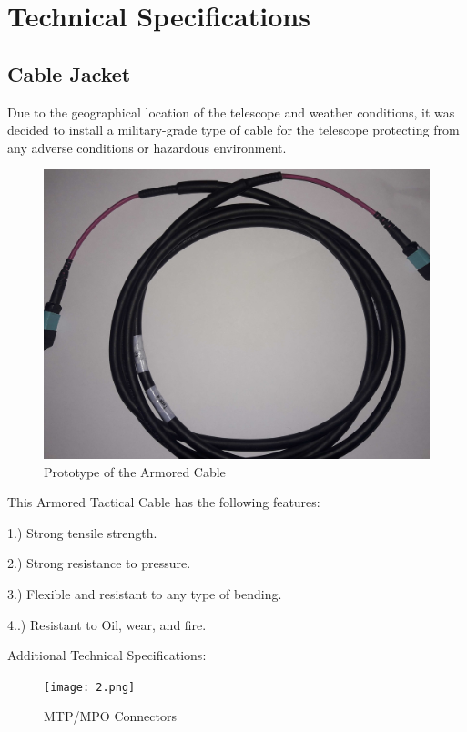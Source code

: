 \section{Technical Specifications}

\subsection{Cable Jacket}

Due to the geographical location of the telescope and weather conditions, it was decided to install a military-grade type of cable for the telescope protecting from any adverse conditions or hazardous environment. 

\begin{figure}
  \includegraphics[width=\textwidth]{images/mtp_militar_cable.jpg}
  \caption{Prototype of the Armored Cable}
  \label{fig:jlsimon}
\end{figure}

This Armored Tactical Cable has the following features:

1.) Strong tensile strength.

2.) Strong resistance to pressure.

3.) Flexible and resistant to any type of bending.

4..) Resistant to Oil, wear, and fire.


Additional Technical Specifications:

\begin{figure}
  \texttt{[image: 2.png]}
  \caption{MTP/MPO Connectors}
  \label{fig:jlsimon}
\end{figure}



